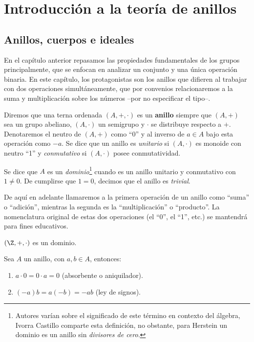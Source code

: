 \documentclass[11pt,oneside]{book}
\begin{document}
\chapter{Introducción a la teoría de anillos}
\section{Anillos, cuerpos e ideales}
En el capítulo anterior repasamos las propiedades fundamentales de los grupos principalmente, que se enfocan en analizar un conjunto y una única operación binaria. En este capítulo, los protagonistas son los anillos que difieren al trabajar con dos operaciones simultáneamente, que por convenios relacionaremos a la suma y multiplicación sobre los números --por no especificar el tipo--.
\begin{mydef}[Anillo]
Diremos que una terna ordenada $(A,+,\cdot)$ es un \textbf{anillo} siempre que $(A,+)$ sea un grupo abeliano, $(A,\cdot)$ un semigrupo y $\cdot$ se distribuye respecto a $+$. Denotaremos el neutro de $(A,+)$ como ``0'' y al inverso de $a\in A$ bajo esta operación como $-a$. Se dice que un anillo es \textit{unitario} si $(A,\cdot)$ es monoide con neutro ``1'' y \textit{conmutativo} si $(A,\cdot)$ posee conmutatividad.

Se dice que $A$ es un \textit{dominio}\footnote{Autores varían sobre el significado de este término en contexto del álgebra, Ivorra Castillo comparte esta definición, no obstante, para Herstein un dominio es un anillo sin \textit{divisores de cero}.} cuando es un anillo unitario y conmutativo con $1\neq 0$. De cumplirse que $1=0$, decimos que el anillo es \textit{trivial}.
\end{mydef}
De aquí en adelante llamaremos a la primera operación de un anillo como ``suma'' o ``adición'', mientras la segunda es la ``multiplicación'' o ``producto''. La nomenclatura original de estas dos operaciones (el ``0'', el ``1'', etc.) se mantendrá para fines educativos.
\begin{thm}
$(\Z,+,\cdot)$ es un dominio.
\end{thm}
\begin{thm}
Sea $A$ un anillo, con $a,b\in A$, entonces:
\begin{enumerate}[$a)$]
	\item $a\cdot 0=0\cdot a=0$ (absorbente o aniquilador).
	\item $(-a)b=a(-b)=-ab$ (ley de signos).
\end{enumerate}
\end{thm}
\end{document}
